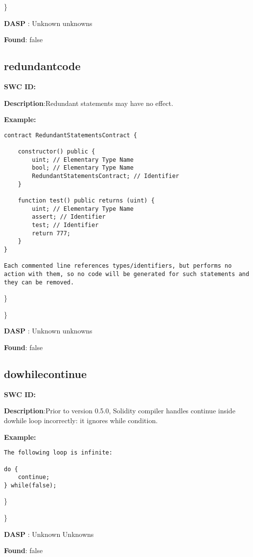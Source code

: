 \documentclass{article}
\begin{document}
\} 

\textbf{DASP} : Unknown unknowns

\textbf{Found}: false

\subsection{redundant\textunderscore code} 
\textbf{SWC \textunderscore ID:} 

\textbf{Description}:Redundant statements may have no effect.


\textbf{Example:} 
\begin{verbatim}
contract RedundantStatementsContract {

    constructor() public {
        uint; // Elementary Type Name
        bool; // Elementary Type Name
        RedundantStatementsContract; // Identifier
    }

    function test() public returns (uint) {
        uint; // Elementary Type Name
        assert; // Identifier
        test; // Identifier
        return 777;
    }
}

Each commented line references types/identifiers, but performs no action with them, so no code will be generated for such statements and they can be removed.

\end{verbatim}\} 

\} 

\textbf{DASP} : Unknown unknowns

\textbf{Found}: false

\subsection{do\textunderscore while\textunderscore continue} 
\textbf{SWC \textunderscore ID:} 

\textbf{Description}:Prior to version 0.5.0, Solidity compiler handles continue inside do\textendash while loop incorrectly: it ignores while condition.


\textbf{Example:} 
\begin{verbatim}
The following loop is infinite:

do {
    continue;
} while(false);

\end{verbatim}\} 

\} 

\textbf{DASP} : Unknown Unknowns

\textbf{Found}: false
\end{document}
